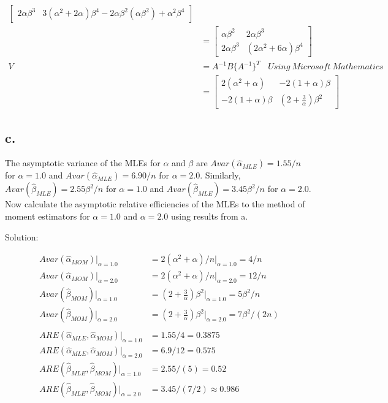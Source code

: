 \documentclass[
  letterpaper,
  DIV=11,
  numbers=noendperiod]{scrreprt}
\begin{document}
\[\begin{aligned}
\begin{bmatrix}
2 \alpha \beta^3  & 3(\alpha^2+2\alpha)\beta^4-2 \alpha \beta^2(\alpha \beta^2) + \alpha^2\beta^4\end{bmatrix}\\
&=   \begin{bmatrix} \alpha \beta^2 & 2 \alpha \beta^3 \\
2 \alpha \beta^3  & (2\alpha^2+6\alpha)\beta^4 \end{bmatrix}\\
V &= A^{-1} B \{ A^{-1} \}^T ~~~~ Using~Microsoft~Mathematics \\
&= \begin{bmatrix} 2(\alpha^2 +\alpha) & -2(1+ \alpha) \beta \\
-2(1+ \alpha) \beta & \left(2 + \frac 3 \alpha \right)\beta^2 \end{bmatrix}
\end{aligned}\]

\hypertarget{c.-3}{%
\subsection{c.}\label{c.-3}}

The asymptotic variance of the MLEs for \(\alpha\) and \(\beta\) are
\(Avar(\hat \alpha_{MLE})= 1.55/n\) for \(\alpha = 1.0\) and
\(Avar(\hat \alpha_{MLE})= 6.90/n\) for \(\alpha = 2.0\). Similarly,
\(Avar(\hat \beta_{MLE})= 2.55\beta^2/n\) for \(\alpha = 1.0\) and
\(Avar(\hat \beta_{MLE})= 3.45\beta^2/n\) for \(\alpha = 2.0\). Now
calculate the asymptotic relative efficiencies of the MLEs to the method
of moment estimators for \(\alpha = 1.0\) and \(\alpha = 2.0\) using
results from a.

Solution:

\[\begin{aligned}
Avar(\hat \alpha_{MOM}) |_{\alpha = 1.0} &= 2(\alpha^2 +\alpha)/n \big|_{\alpha = 1.0} = 4/n \\
Avar(\hat \alpha_{MOM}) |_{\alpha = 2.0} &= 2(\alpha^2 +\alpha)/n \big|_{\alpha = 2.0} = 12/n \\
Avar(\hat \beta_{MOM}) |_{\alpha = 1.0} &=\left(2 + \frac 3 \alpha \right)\beta^2 \big|_{\alpha = 1.0} = 5 \beta^2 /n \\
Avar(\hat \beta_{MOM}) |_{\alpha = 2.0} &= \left(2 + \frac 3 \alpha \right)\beta^2 \big|_{\alpha = 2.0} = 7 \beta^2/(2n) \\ \\
ARE(\hat \alpha_{MLE},\hat \alpha_{MOM})|_{\alpha = 1.0} &= 1.55/4 = 0.3875 \\
ARE(\hat \alpha_{MLE},\hat \alpha_{MOM})|_{\alpha = 2.0} &= 6.9/12 = 0.575 \\
ARE(\hat \beta_{MLE},\hat \beta_{MOM})|_{\alpha = 1.0} &= 2.55/(5) = 0.52 \\
ARE(\hat \beta_{MLE},\hat \beta_{MOM})|_{\alpha = 2.0} &= 3.45/(7/2) \approx 0.986 \\
\end{aligned}\]
\end{document}
